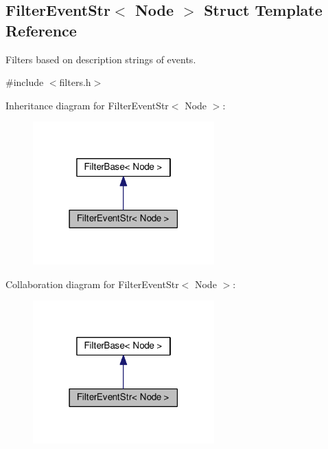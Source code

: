 \hypertarget{structFilterEventStr}{}\subsection{Filter\+Event\+Str$<$ Node $>$ Struct Template Reference}
\label{structFilterEventStr}


Filters based on description strings of events.  




{\ttfamily \#include $<$filters.\+h$>$}



Inheritance diagram for Filter\+Event\+Str$<$ Node $>$\+:\nopagebreak
\begin{figure}[H]
\begin{center}
\leavevmode
\includegraphics[width=198pt]{structFilterEventStr__inherit__graph}
\end{center}
\end{figure}


Collaboration diagram for Filter\+Event\+Str$<$ Node $>$\+:\nopagebreak
\begin{figure}[H]
\begin{center}
\leavevmode
\includegraphics[width=198pt]{structFilterEventStr__coll__graph}
\end{center}
\end{figure}
